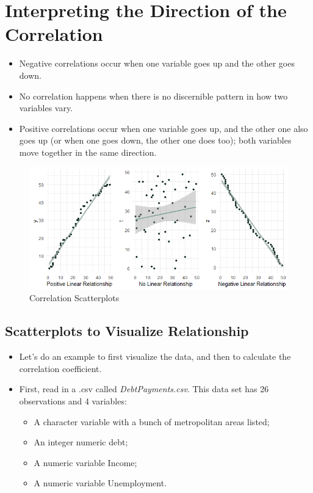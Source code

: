 \documentclass[
  letterpaper,
  DIV=11,
  numbers=noendperiod]{scrreprt}
\providecommand{\tightlist}{%
  \setlength{\itemsep}{0pt}\setlength{\parskip}{0pt}}\usepackage{longtable,booktabs,array}
\begin{document}

\chapter{Interpreting the Direction of the
Correlation}\label{interpreting-the-direction-of-the-correlation}

\begin{itemize}
\tightlist
\item
  Negative correlations occur when one variable goes up and the other
  goes down.
\item
  No correlation happens when there is no discernible pattern in how two
  variables vary.
\item
  Positive correlations occur when one variable goes up, and the other
  one also goes up (or when one goes down, the other one does too); both
  variables move together in the same direction.
\end{itemize}

\begin{figure}[H]

{\centering \includegraphics{Pictures/Ch8/RelationshipScatter.png}

}

\caption{Correlation Scatterplots}

\end{figure}%

\section{Scatterplots to Visualize
Relationship}\label{scatterplots-to-visualize-relationship}

\begin{itemize}
\item
  Let's do an example to first visualize the data, and then to calculate
  the correlation coefficient.
\item
  First, read in a .csv called \emph{DebtPayments.csv}. This data set
  has 26 observations and 4 variables:

  \begin{itemize}
  \tightlist
  \item
    A character variable with a bunch of metropolitan areas listed;
  \item
    An integer numeric debt;
  \item
    A numeric variable Income;
  \item
    A numeric variable Unemployment.
  \end{itemize}
\end{itemize}
\end{document}
